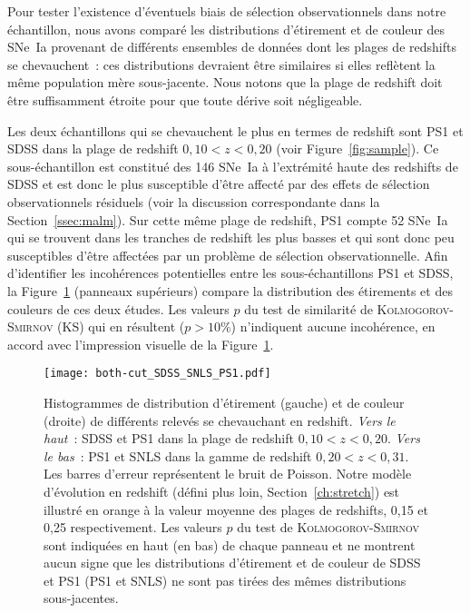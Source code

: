 \documentclass[../main/main.tex]{subfiles}
\begin{document}
Pour tester l'existence d'éventuels biais de sélection observationnels dans
notre échantillon, nous avons comparé les distributions d'étirement et de couleur
des SNe~Ia provenant de différents ensembles de données dont les plages de
redshifts se chevauchent~: ces distributions devraient être similaires si elles
reflètent la même population mère sous-jacente. Nous notons que la plage de
redshift doit être suffisamment étroite pour que toute dérive soit négligeable.

Les deux échantillons qui se chevauchent le plus en termes de redshift sont PS1
et SDSS dans la plage de redshift $0,10 < z < 0,20$ (voir
Figure~\ref{fig:sample}). Ce sous-échantillon est constitué des 146 SNe~Ia à
l'extrémité haute des redshifts de SDSS et est donc le plus susceptible d'être
affecté par des effets de sélection observationnels résiduels (voir la
discussion correspondante dans la Section~\ref{ssec:malm}). Sur cette même plage
de redshift, PS1 compte 52 SNe~Ia qui se trouvent dans les tranches de redshift
les plus basses et qui sont donc peu susceptibles d'être affectées par un
problème de sélection observationnelle. Afin d'identifier les incohérences
potentielles entre les sous-échantillons PS1 et SDSS, la Figure~\ref{fig:testvl}
(panneaux supérieurs) compare la distribution des étirements et des couleurs de
ces deux études. Les valeurs $p$ du test de similarité de
\textsc{Kolmogorov-Smirnov} (KS) qui en résultent ($p > 10\%$) n'indiquent
aucune incohérence, en accord avec l'impression visuelle de la
Figure~\ref{fig:testvl}.

\begin{figure}[ht]
    \centering
    \texttt{[image: both-cut\_SDSS\_SNLS\_PS1.pdf]}
    \caption[Histogrammes de test de similarité de \textsc{Kolmogorov-Smirnov}
    entre les sondages SDSS et PS1 d'une part, PS1 et SNLS d'autre par, en
    étirement et en couleur]{Histogrammes de distribution d'étirement (gauche) et
        de couleur (droite) de différents relevés se chevauchant en redshift.
        \textit{Vers le haut}~: SDSS et PS1 dans la plage de redshift $0,10 < z
        < 0,20$. \textit{Vers le bas}~: PS1 et SNLS dans la gamme de redshift
        $0,20 < z < 0,31$. Les barres d'erreur représentent le bruit de Poisson.
        Notre modèle d'évolution en redshift (défini plus loin,
        Section~\ref{ch:stretch}) est illustré en orange à la valeur moyenne des
        plages de redshifts, 0,15 et 0,25 respectivement. Les valeurs $p$ du
        test de \textsc{Kolmogorov-Smirnov} sont indiquées en haut (en bas) de
        chaque panneau et ne montrent aucun signe que les distributions
        d'étirement et de couleur de SDSS et PS1 (PS1 et SNLS) ne sont pas
    tirées des mêmes distributions sous-jacentes.}
    \label{fig:testvl}
\end{figure}
\end{document}
